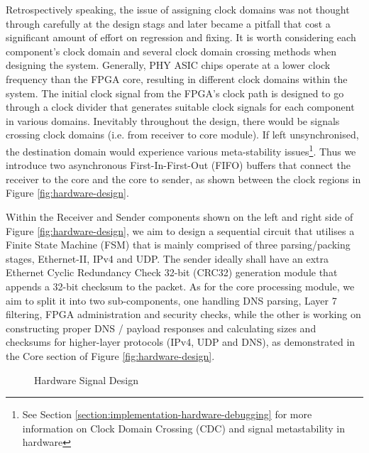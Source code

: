 \documentclass[a4paper]{report}
\begin{document}
Retrospectively speaking, the issue of assigning clock domains was not thought through carefully at the design stags and later became a pitfall that cost a significant amount of effort on regression and fixing. It is worth considering each component's clock domain and several clock domain crossing methods when designing the system. Generally, PHY ASIC chips operate at a lower clock frequency than the FPGA core, resulting in different clock domains within the system. The initial clock signal from the FPGA's clock path is designed to go through a clock divider that generates suitable clock signals for each component in various domains. Inevitably throughout the design, there would be signals crossing clock domains (i.e. from receiver to core module). If left unsynchronised, the destination domain would experience various meta-stability issues\footnote{See Section \ref{section:implementation-hardware-debugging} for more information on Clock Domain Crossing (CDC) and signal metastability in hardware}. Thus we introduce two asynchronous First-In-First-Out (FIFO) buffers that connect the receiver to the core and the core to sender, as shown between the clock regions in Figure \ref{fig:hardware-design}.

Within the Receiver and Sender components shown on the left and right side of Figure \ref{fig:hardware-design}, we aim to design a sequential circuit that utilises a Finite State Machine (FSM) that is mainly comprised of three parsing/packing stages, Ethernet-II, IPv4 and UDP. The sender ideally shall have an extra Ethernet Cyclic Redundancy Check 32-bit (CRC32) \cite{ieee802.3ethernet-2018} generation module that appends a 32-bit checksum to the packet. As for the core processing module, we aim to split it into two sub-components, one handling DNS parsing, Layer 7 filtering, FPGA administration and security checks, while the other is working on constructing proper DNS / payload responses and calculating sizes and checksums for higher-layer protocols (IPv4, UDP and DNS), as demonstrated in the Core section of Figure \ref{fig:hardware-design}.

\begin{figure}[h!]
  \caption{Hardware Signal Design}
  \label{fig:hardware-signal-design}
\end{figure}
\end{document}
